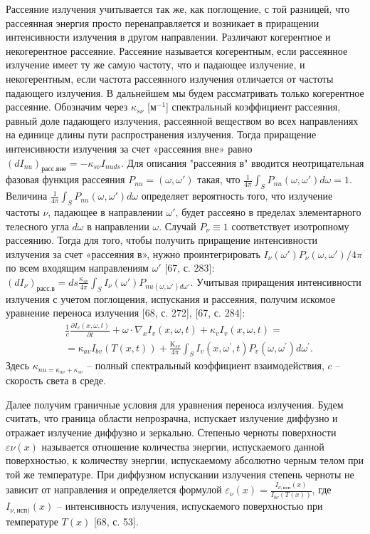 Рассеяние излучения учитывается так же, как поглощение, с той разницей,
что рассеянная энергия просто перенаправляется и возникает в приращении
интенсивности излучения в другом направлении.
Различают когерентное и некогерентное рассеяние.
Рассеяние называется когерентным, если рассеянное излучение имеет ту же самую частоту,
что и падающее излучение, и некогерентным, если частота рассеянного
излучения отличается от частоты падающего излучения.
В дальнейшем мы будем рассматривать только когерентное рассеяние.
Обозначим через $\kappa_{s\nu}$ [$\text{м}^{-1}$] спектральный коэффициент рассеяния, равный
доле падающего излучения, рассеянной веществом во всех направлениях на
единице длины пути распространения излучения.
Тогда приращение интенсивности излучения за счет «рассеяния вне» равно
$(dI_{nu})_\text{расс.вне} = - \kappa_{s\nu}I_{nuds}$.
Для описания "рассеяния в" вводится неотрицательная фазовая функция рассеяния
$P_{nu} = (\omega, \omega')$ такая, что $\frac{1}{4\pi}\int_S P_{nu} (\omega, \omega')d\omega = 1$.
Величина $\frac{1}{4\pi}\int_S P_{nu} (\omega, \omega')d\omega$
определяет вероятность того, что излучение частоты $\nu$,
падающее в направлении $\omega'$,
будет рассеяно в пределах элементарного телесного угла $d\omega$ в направлении $\omega$.
Случай $P_\nu \equiv 1$ соответствует изотропному рассеянию.
Тогда для того, чтобы получить приращение интенсивности излучения за счет «рассеяния в», нужно
проинтегрировать $I_\nu(\omega')P_\nu(\omega,\omega')/4\pi$ по всем входящим направлениям
$\omega'$ [67, с. 283]:
$(dI_\nu)_\text{расс.в} = ds \frac{\kappa_{s\nu}}{4\pi}\int_S I_\nu(\omega')P_{nu(\omega,\omega')d\omega'}$.
Учитывая приращения интенсивности излучения с учетом поглощения,
испускания и рассеяния, получим искомое уравнение переноса излучения
[68, с. 272], [67, с. 284]:
\[
    \begin{aligned}
        &\frac{1}{c} \frac{\partial I_v(x, \omega, t)}
        {\partial t}+\omega \cdot \nabla_x I_v(x, \omega, t)+\kappa_v I_v(x, \omega, t)=\\
        &=\mathrm{\kappa}_{a v} I_{b v}(T(x, t))+\frac{\mathrm{K}_{s v}}{4 \pi}
        \int_S I_v\left(x, \omega^{\prime}, t\right) P_v\left(\omega, \omega^{\prime}\right) d \omega^{\prime}.
    \end{aligned}
\]
Здесь $\kappa_{nu = \kappa_{a\nu} + \kappa_{s\nu}}$ -- полный спектральный коэффициент взаимодействия,
$c$ --  скорость света в среде.


Далее получим граничные условия для уравнения переноса излучения.
Будем считать, что граница области непрозрачна, испускает излучение диффузно
и отражает излучение диффузно и зеркально.
Степенью черноты поверхности $\varepsilon \nu(x)$ называется отношение количества энергии,
испускаемого данной поверхностью, к количеству энергии, испускаемому абсолютно черным телом при
той же температуре.
При диффузном испускании излучения степень черноты не зависит от направления и определяется формулой
$\varepsilon_\nu(x) = \frac{I_{\nu,\text{исп}}(x)}{I_{b\nu}(T(x))}$, где
$I_{\nu,\text{исп})}(x)$ -- интенсивность излучения, испускаемого
поверхностью при температуре $T(x)$ [68, с. 53].


